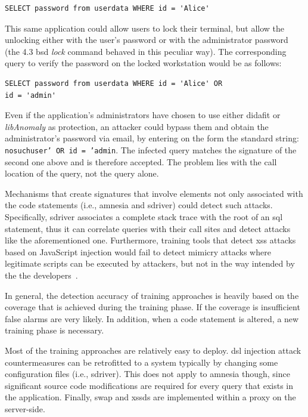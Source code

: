 \documentclass[conference]{IEEEtran}
\begin{document}
\bgroup \lstset{language=SQL}
\begin{small}
\begin{lstlisting}
SELECT password from userdata WHERE id = 'Alice'
\end{lstlisting}
\end{small}
\egroup

\noindent
This same application could allow users to lock their terminal,
but allow the unlocking either with the user's password or with
the administrator password (the 4.3 {\sc bsd} {\em lock} command
behaved in this peculiar way).
The corresponding query to verify the password on the locked
workstation would be as follows:

\bgroup
\lstset{language=SQL}
\begin{small}
\begin{lstlisting}
SELECT password from userdata WHERE id = 'Alice' OR
id = 'admin'
\end{lstlisting}
\end{small}
\egroup

\noindent
Even if the application's administrators have chosen to use
either {\sc didafit} or {\it libAnomaly} as protection,
an attacker could bypass them and obtain the
administrator's password via email,
by entering on the form the standard string:
{\tt nosuchuser' OR id = 'admin}. The infected query matches the
signature of the second one above and is therefore accepted.
The problem lies with the call location of the query, not the query alone.

Mechanisms that create signatures that involve elements not only
associated with the code statements (i.e., {\sc amnesia} and {\sc
  sd}river) could detect such attacks. Specifically, {\sc sd}river
associates a complete stack trace with the root of an {\sc sql}
statement, thus it can correlate queries with their call sites and
detect attacks like the aforementioned one. Furthermore, training
tools that detect {\sc xss} attacks based on JavaScript injection
would fail to detect mimicry attacks where legitimate scripts can be
executed by attackers, but not in the way intended by the the
developers~\cite{APKLM10}.

In general, the detection accuracy of training approaches is heavily
based on the coverage that is achieved during the training phase. If
the coverage is insufficient false alarms are very likely. In
addition, when a code statement is altered, a new training phase is
necessary.

Most of the training approaches are relatively easy to deploy.
{\sc dsl} injection attack countermeasures
can be retrofitted to a system typically by changing
some configuration files (i.e., {\sc sd}river). This does not apply
to {\sc amnesia} though, since significant source code
modifications are required for every query that exists
in the application. Finally, {\sc swap} and {\sc xssds}
are implemented within a proxy on the server-side.
\end{document}
